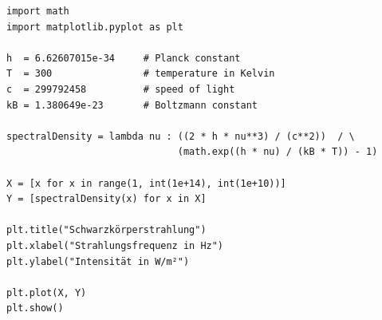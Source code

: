 
\begin{frame}[fragile]
%
\begin{codebox}
\begin{verbatim}
import math
import matplotlib.pyplot as plt

h  = 6.62607015e-34     # Planck constant
T  = 300                # temperature in Kelvin
c  = 299792458          # speed of light
kB = 1.380649e-23       # Boltzmann constant

spectralDensity = lambda nu : ((2 * h * nu**3) / (c**2))  / \
                              (math.exp((h * nu) / (kB * T)) - 1)

X = [x for x in range(1, int(1e+14), int(1e+10))]
Y = [spectralDensity(x) for x in X]

plt.title("Schwarzkörperstrahlung")
plt.xlabel("Strahlungsfrequenz in Hz")
plt.ylabel("Intensität in W/m²")

plt.plot(X, Y)
plt.show()
\end{verbatim}
\end{codebox}
%
%
\end{frame}


